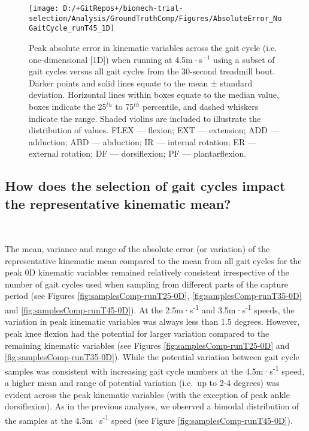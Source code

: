 \documentclass[]{elsarticle} %
\begin{document}
\begin{figure}

{\centering \texttt{[image: D:/+GitRepos+/biomech-trial-selection/Analysis/GroundTruthComp/Figures/AbsoluteError\_NoGaitCycle\_runT45\_1D]} 

}

\caption{Peak absolute error in kinematic variables across the gait cycle (i.e. one-dimensional [1D]) when running at 4.5m·s$^{-1}$ using a subset of gait cycles versus all gait cycles from the 30-second treadmill bout. Darker points and solid lines equate to the mean ± standard deviation. Horizontal lines within boxes equate to the median value, boxes indicate the 25$^{th}$ to 75$^{th}$ percentile, and dashed whiskers indicate the range. Shaded violins are included to illustrate the distribution of values. FLEX — flexion; EXT — extension; ADD — adduction; ABD — abduction; IR — internal rotation; ER — external rotation; DF — dorsiflexion; PF — plantarflexion.}\label{fig:groundTruthError-runT45-1D}
\end{figure}

\hypertarget{how-does-the-selection-of-gait-cycles-impact-the-representative-kinematic-mean}{%
\subsection{How does the selection of gait cycles impact the
representative kinematic
mean?}\label{how-does-the-selection-of-gait-cycles-impact-the-representative-kinematic-mean}}

~

The mean, variance and range of the absolute error (or variation) of the
representative kinematic mean compared to the mean from all gait cycles
for the peak 0D kinematic variables remained relatively consistent
irrespective of the number of gait cycles used when sampling from
different parts of the capture period (see Figures
\ref{fig:samplesComp-runT25-0D}, \ref{fig:samplesComp-runT35-0D} and
\ref{fig:samplesComp-runT45-0D}). At the 2.5m·s\textsuperscript{-1} and
3.5m·s\textsuperscript{-1} speeds, the variation in peak kinematic
variables was always less than 1.5 degrees. However, peak knee flexion
had the potential for larger variation compared to the remaining
kinematic variables (see Figures \ref{fig:samplesComp-runT25-0D} and
\ref{fig:samplesComp-runT35-0D}). While the potential variation between
gait cycle samples was consistent with increasing gait cycle numbers at
the 4.5m·s\textsuperscript{-1} speed, a higher mean and range of
potential variation (i.e.~up to 2-4 degrees) was evident across the peak
kinematic variables (with the exception of peak ankle dorsiflexion). As
in the previous analyses, we observed a bimodal distribution of the
samples at the 4.5m·s\textsuperscript{-1} speed (see Figure
\ref{fig:samplesComp-runT45-0D}).
\end{document}
